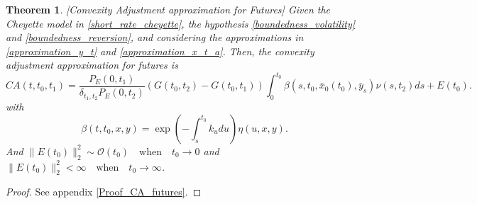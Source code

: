 \documentclass[a4paper,10pt]{article}
\newtheorem{theorem}{Theorem}[section]
\newcommand{\1}{\mathbf{1}}
\begin{document}
\begin{theorem}\label{Th_CA_futures}[Convexity Adjustment approximation for Futures]
Given the Cheyette model in \eqref{short_rate_cheyette}, the hypothesis \ref{boundedness_volatility} and \ref{boundedness_reversion}, and considering the approximations in \eqref{approximation_y_t} and \eqref{approximation_x_t_a}. Then, the convexity adjustment approximation for futures is 
\begin{equation}\label{ca_approximation_futures}
CA(t,t_0,t_1) = \frac{P_{E}(0,t_1)}{\delta_{t_1,t_2} P_{E}(0,t_2)} \left(G(t_0,t_2)  - G(t_0,t_1) \right) \int_{0}^{t_0} \beta(s,t_0,\bar{x}_0(t_0),\bar{y}_s) \nu(s,t_2) ds + E(t_0). 
\end{equation}
with 
\begin{equation*}
\beta(t,t_0,x,y) = \exp\left(-\int_{s}^{t_0}k_u du \right) \eta(u,x,y).
\end{equation*}
And $\|E(t_0)\|^{2}_{2} \sim \mathcal{O}(t_0) \quad \text{when} \quad t_0 \to 0$ and $\|E(t_0)\|^{2}_{2} < \infty \quad \text{when} \quad t_0 \to \infty$. 
\end{theorem}
\begin{proof}
See appendix \ref{Proof_CA_futures}.
\end{proof}
\end{document}

